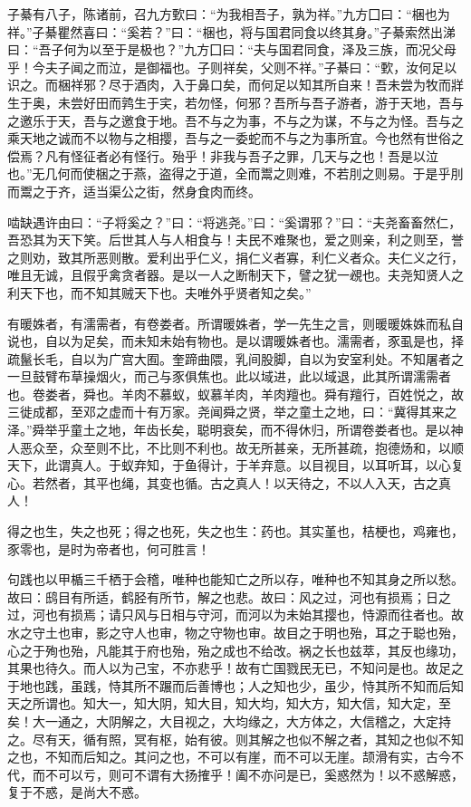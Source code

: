 \documentclass[12pt,UTF8]{ctexbook}
\begin{document}
子綦有八子，陈诸前，召九方歅曰：“为我相吾子，孰为祥。”九方囗曰：“梱也为祥。”子綦瞿然喜曰：“奚若？”曰：“梱也，将与国君同食以终其身。”子綦索然出涕曰：“吾子何为以至于是极也？”九方囗曰：“夫与国君同食，泽及三族，而况父母乎！今夫子闻之而泣，是御福也。子则祥矣，父则不祥。”子綦曰：“歅，汝何足以识之。而梱祥邪？尽于酒肉，入于鼻口矣，而何足以知其所自来！吾未尝为牧而牂生于奥，未尝好田而鹑生于宎，若勿怪，何邪？吾所与吾子游者，游于天地，吾与之邀乐于天，吾与之邀食于地。吾不与之为事，不与之为谋，不与之为怪。吾与之乘天地之诚而不以物与之相撄，吾与之一委蛇而不与之为事所宜。今也然有世俗之偿焉？凡有怪征者必有怪行。殆乎！非我与吾子之罪，几天与之也！吾是以泣也。”无几何而使梱之于燕，盗得之于道，全而鬻之则难，不若刖之则易。于是乎刖而鬻之于齐，适当渠公之街，然身食肉而终。

啮缺遇许由曰：“子将奚之？”曰：“将逃尧。”曰：“奚谓邪？”曰：“夫尧畜畜然仁，吾恐其为天下笑。后世其人与人相食与！夫民不难聚也，爱之则亲，利之则至，誉之则劝，致其所恶则散。爱利出乎仁义，捐仁义者寡，利仁义者众。夫仁义之行，唯且无诚，且假乎禽贪者器。是以一人之断制天下，譬之犹一覕也。夫尧知贤人之利天下也，而不知其贼天下也。夫唯外乎贤者知之矣。”

有暖姝者，有濡需者，有卷娄者。所谓暖姝者，学一先生之言，则暖暖姝姝而私自说也，自以为足矣，而未知未始有物也。是以谓暖姝者也。濡需者，豕虱是也，择疏鬣长毛，自以为广宫大囿。奎蹄曲隈，乳间股脚，自以为安室利处。不知屠者之一旦鼓臂布草操烟火，而己与豕俱焦也。此以域进，此以域退，此其所谓濡需者也。卷娄者，舜也。羊肉不慕蚁，蚁慕羊肉，羊肉羶也。舜有羶行，百姓悦之，故三徙成都，至邓之虚而十有万家。尧闻舜之贤，举之童土之地，曰：“冀得其来之泽。”舜举乎童土之地，年齿长矣，聪明衰矣，而不得休归，所谓卷娄者也。是以神人恶众至，众至则不比，不比则不利也。故无所甚亲，无所甚疏，抱德炀和，以顺天下，此谓真人。于蚁弃知，于鱼得计，于羊弃意。以目视目，以耳听耳，以心复心。若然者，其平也绳，其变也循。古之真人！以天待之，不以人入天，古之真人！

得之也生，失之也死；得之也死，失之也生：药也。其实堇也，桔梗也，鸡雍也，豕零也，是时为帝者也，何可胜言！

句践也以甲楯三千栖于会稽，唯种也能知亡之所以存，唯种也不知其身之所以愁。故曰：鸱目有所适，鹤胫有所节，解之也悲。故曰：风之过，河也有损焉；日之过，河也有损焉；请只风与日相与守河，而河以为未始其撄也，恃源而往者也。故水之守土也审，影之守人也审，物之守物也审。故目之于明也殆，耳之于聪也殆，心之于殉也殆，凡能其于府也殆，殆之成也不给改。祸之长也兹萃，其反也缘功，其果也待久。而人以为己宝，不亦悲乎！故有亡国戮民无已，不知问是也。故足之于地也践，虽践，恃其所不蹍而后善博也；人之知也少，虽少，恃其所不知而后知天之所谓也。知大一，知大阴，知大目，知大均，知大方，知大信，知大定，至矣！大一通之，大阴解之，大目视之，大均缘之，大方体之，大信稽之，大定持之。尽有天，循有照，冥有枢，始有彼。则其解之也似不解之者，其知之也似不知之也，不知而后知之。其问之也，不可以有崖，而不可以无崖。颉滑有实，古今不代，而不可以亏，则可不谓有大扬搉乎！阖不亦问是已，奚惑然为！以不惑解惑，复于不惑，是尚大不惑。
\end{document}
